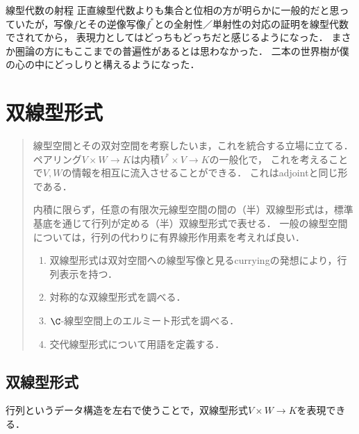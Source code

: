 \documentclass[uplatex, dvipdfmx]{jsreport}
\begin{document}
\begin{itembox}[l]{線型代数の射程}
    正直線型代数よりも集合と位相の方が明らかに一般的だと思っていたが，写像$f$とその逆像写像$f^*$との全射性／単射性の対応の証明を線型代数でされてから，
    表現力としてはどっちもどっちだと感じるようになった．
    まさか圏論の方にもここまでの普遍性があるとは思わなかった．
    二本の世界樹が僕の心の中にどっしりと構えるようになった．
\end{itembox}

\chapter{双線型形式}

\begin{quotation}
    線型空間とその双対空間を考察したいま，これを統合する立場に立てる．
    ペアリング$V\times W\to K$は内積$V^*\times V\to K$の一般化で，
    これを考えることで$V,W$の情報を相互に流入させることができる．
    これはadjointと同じ形である．

    内積に限らず，任意の有限次元線型空間の間の（半）双線型形式は，標準基底を通じて行列が定める（半）双線型形式で表せる．
    一般の線型空間については，行列の代わりに有界線形作用素を考えれば良い．
    
    \begin{enumerate}
        \item 双線型形式は双対空間への線型写像と見るcurryingの発想により，行列表示を持つ．
        \item 対称的な双線型形式を調べる．
        \item $\C$-線型空間上のエルミート形式を調べる．
        \item 交代線型形式について用語を定義する．
    \end{enumerate}
\end{quotation}

\section{双線型形式}

\begin{tcolorbox}[colframe=ForestGreen, colback=ForestGreen!10!white, breakable]
    行列というデータ構造を左右で使うことで，双線型形式$V\times W\to K$を表現できる．
\end{tcolorbox}
\end{document}
